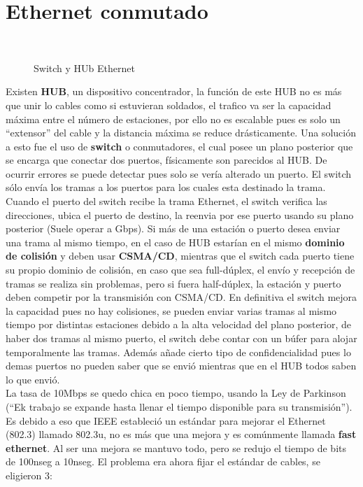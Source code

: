 \documentclass[
	12pt, %
	fleqn, %
	a4paper, %
]{LegrandOrangeBook}
\begin{document}
\section{Ethernet conmutado}
\begin{figure}[]
\centering
{}\\
\caption{Switch y HUb Ethernet}
\end{figure}
Existen \textbf{HUB}, un dispositivo concentrador, la función de este HUB no es más que unir lo cables como si estuvieran soldados, el trafico va ser la capacidad máxima entre el número de estaciones, por ello no es escalable pues es solo un ``extensor'' del cable y la distancia máxima se reduce drásticamente. Una solución a esto fue el uso de \textbf{switch} o conmutadores, el cual posee un plano posterior que se encarga que conectar dos puertos, físicamente son parecidos al HUB. De ocurrir errores se puede detectar pues solo se vería alterado un puerto. El switch sólo envía los tramas a los puertos para los cuales esta destinado la trama. Cuando el puerto del switch recibe la trama Ethernet, el switch verifica las direcciones, ubica el puerto de destino, la reenvia por ese puerto usando su plano posterior (Suele operar a Gbps). Si más de una estación o puerto desea enviar una trama al mismo tiempo, en el caso de HUB estarían en el mismo \textbf{dominio de colisión} y deben usar \textbf{CSMA/CD}, mientras que el switch cada puerto tiene su propio dominio de colisión, en caso que sea full-dúplex, el envío y recepción de tramas se realiza sin problemas, pero si fuera half-dúplex, la estación y puerto deben competir por la transmisión con CSMA/CD. En definitiva el switch mejora la capacidad pues no hay colisiones, se pueden enviar varias tramas al mismo tiempo por distintas estaciones debido a la alta velocidad del plano posterior, de haber dos tramas al mismo puerto, el switch debe contar con un búfer para alojar temporalmente las tramas. Además añade cierto tipo de confidencialidad pues lo demas puertos no pueden saber que se envió mientras que en el HUB todos saben lo que envió.\\
La tasa de 10Mbps se quedo chica en poco tiempo, usando la Ley de Parkinson (``Ek trabajo se expande hasta llenar el tiempo disponible para su transmisión'').\\
Es debido a eso que IEEE estableció un estándar para mejorar el Ethernet (802.3) llamado 802.3u, no es más que una mejora y es comúnmente llamada \textbf{fast ethernet}. Al ser una mejora se mantuvo todo, pero se redujo el tiempo de bits de 100nseg a 10nseg. El problema era ahora fijar el estándar de cables, se eligieron 3:
\end{document}
